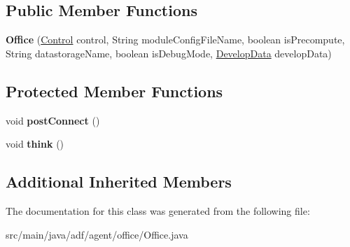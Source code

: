 \subsection*{Public Member Functions}
\begin{DoxyCompactItemize}
\item 
\hypertarget{classadf_1_1agent_1_1office_1_1Office_a268ea2e1ac55d33f643beb974dba8071}{}\label{classadf_1_1agent_1_1office_1_1Office_a268ea2e1ac55d33f643beb974dba8071} 
{\bfseries Office} (\hyperlink{classadf_1_1component_1_1control_1_1Control}{Control} control, String module\+Config\+File\+Name, boolean is\+Precompute, String datastorage\+Name, boolean is\+Debug\+Mode, \hyperlink{classadf_1_1agent_1_1develop_1_1DevelopData}{Develop\+Data} develop\+Data)
\end{DoxyCompactItemize}
\subsection*{Protected Member Functions}
\begin{DoxyCompactItemize}
\item 
\hypertarget{classadf_1_1agent_1_1office_1_1Office_a501ed865cdd1e754940ba5dfc10484f3}{}\label{classadf_1_1agent_1_1office_1_1Office_a501ed865cdd1e754940ba5dfc10484f3} 
void {\bfseries post\+Connect} ()
\item 
\hypertarget{classadf_1_1agent_1_1office_1_1Office_aa101ca935dd000ff85b1f31733e9bd9e}{}\label{classadf_1_1agent_1_1office_1_1Office_aa101ca935dd000ff85b1f31733e9bd9e} 
void {\bfseries think} ()
\end{DoxyCompactItemize}
\subsection*{Additional Inherited Members}


The documentation for this class was generated from the following file\+:\begin{DoxyCompactItemize}
\item 
src/main/java/adf/agent/office/Office.\+java\end{DoxyCompactItemize}
